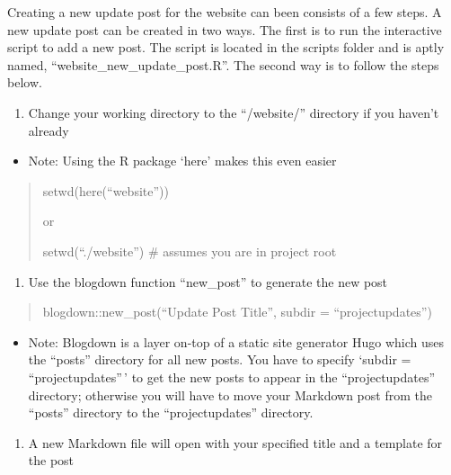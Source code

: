 \documentclass[
]{book}
\providecommand{\tightlist}{%
  \setlength{\itemsep}{0pt}\setlength{\parskip}{0pt}}
\begin{document}
Creating a new update post for the website can been consists of a few steps.
A new update post can be created in two ways. The first is to run the interactive script to add a new post. The script is located in the scripts folder and is aptly named, ``website\_new\_update\_post.R''. The second way is to follow the steps below.

\begin{enumerate}
\def\labelenumi{\arabic{enumi}.}
\tightlist
\item
  Change your working directory to the ``/website/'' directory if you haven't already
\end{enumerate}

\begin{itemize}
\tightlist
\item
  Note: Using the R package `here' makes this even easier
\end{itemize}

\begin{quote}
setwd(here(``website''))

or

setwd(``./website'') \# assumes you are in project root
\end{quote}

\begin{enumerate}
\def\labelenumi{\arabic{enumi}.}
\setcounter{enumi}{1}
\tightlist
\item
  Use the blogdown function ``new\_post'' to generate the new post
\end{enumerate}

\begin{quote}
blogdown::new\_post(``Update Post Title'', subdir = ``projectupdates'')
\end{quote}

\begin{itemize}
\tightlist
\item
  Note: Blogdown is a layer on-top of a static site generator Hugo which uses the ``posts'' directory for all new posts. You have to specify `subdir = ``projectupdates''\,' to get the new posts to appear in the ``projectupdates'' directory; otherwise you will have to move your Markdown post from the ``posts'' directory to the ``projectupdates'' directory.
\end{itemize}

\begin{enumerate}
\def\labelenumi{\arabic{enumi}.}
\setcounter{enumi}{1}
\tightlist
\item
  A new Markdown file will open with your specified title and a template for the post
\end{enumerate}
\end{document}
